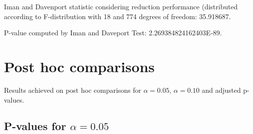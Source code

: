 \documentclass[a4paper,10pt]{article}
\begin{document}
\begin{landscape}
Iman and Davenport statistic considering reduction performance (distributed according to F-distribution with 18 and 774 degrees of freedom: 35.918687.

P-value computed by Iman and Daveport Test: 2.269384824162403E-89.\newline



\pagebreak

\section{Post hoc comparisons}

Results achieved on post hoc comparisons for $\alpha = 0.05$, $\alpha = 0.10$ and adjusted p-values.

\subsection{P-values for $\alpha=0.05$}


\end{landscape}
\end{document}
